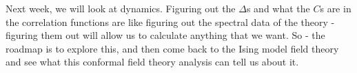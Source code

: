 Next week, we will look at dynamics. Figuring out the $\Delta$s and what the $C$s are in the correlation functions are like figuring out the spectral data of the theory - figuring them out will allow us to calculate anything that we want. So - the roadmap is to explore this, and then come back to the Ising model field theory and see what this conformal field theory analysis can tell us about it.